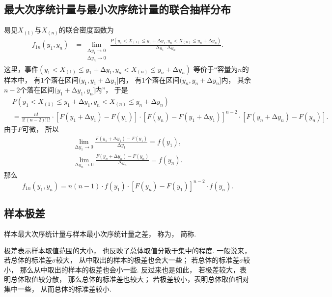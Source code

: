 \subsection{最大次序统计量与最小次序统计量的联合抽样分布}
易见\(X_{(1)}\)与\(X_{(n)}\)的联合密度函数为
\begin{align*}
	f_{1n}(y_1,y_n)
	&= \lim_{\substack{
		\increment y_1\to0 \\
		\increment y_n\to0
	}} \frac{
		P(y_1 < X_{(1)} \leq y_1+\increment y_1,
		  y_n < X_{(n)} \leq y_n+\increment y_n)
	}{\increment y_1 \cdot \increment y_n}.
\end{align*}
这里，事件\((y_1 < X_{(1)} \leq y_1+\increment y_1,
y_n < X_{(n)} \leq y_n+\increment y_n)\)
等价于“容量为\(n\)的样本中，
有\(1\)个落在区间\((y_1,y_1+\increment y_1]\)内，
有\(1\)个落在区间\((y_n,y_n+\increment y_n]\)内，
其余\(n-2\)个落在区间\((y_1+\increment y_1,y_n]\)内”，
于是\begin{align*}
	&P(y_1 < X_{(1)} \leq y_1+\increment y_1,
	  y_n < X_{(n)} \leq y_n+\increment y_n) \\
	&= \frac{n!}{1! (n-2)! 1!}
		\cdot [F(y_1+\increment y_1) - F(y_1)]
		\cdot [F(y_n) - F(y_1+\increment y_1)]^{n-2}
		\cdot [F(y_n+\increment y_n) - F(y_n)].
\end{align*}
由于\(F\)可微，
所以\begin{align*}
	\lim_{\increment y_1\to0}
	\frac{F(y_1+\increment y_1) - F(y_1)}{\increment y_1}
	= f(y_1), \\
	\lim_{\increment y_n\to0}
	\frac{F(y_n+\increment y_n) - F(y_n)}{\increment y_n}
	= f(y_n).
\end{align*}
那么
\begin{equation}\label{equation:次序统计量.最大次序统计量与最小次序统计量的联合密度函数}
	f_{1n}(y_1,y_n)
	= n(n-1) \cdot f(y_1) \cdot [F(y_n) - F(y_1)]^{n-2} \cdot f(y_n).
\end{equation}

\subsection{样本极差}
\begin{definition}
样本最大次序统计量与样本最小次序统计量之差，
称为，
简称.
\end{definition}
极差表示样本取值范围的大小，
也反映了总体取值分散于集中的程度.
一般说来，若总体的标准差\(\sigma\)较大，
从中取出的样本的极差也会大一些；
若总体的标准差\(\sigma\)较小，
那么从中取出的样本的极差也会小一些.
反过来也是如此，
若极差较大，表明总体取值较分散，
那么总体的标准差也较大；
若极差较小，表明总体取值相对集中一些，
从而总体的标准差较小.

